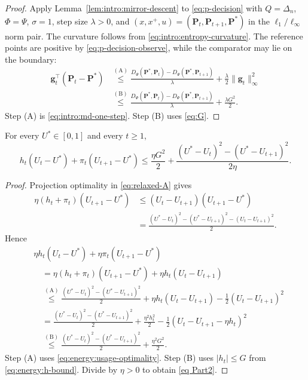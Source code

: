 \begin{proof}
Apply Lemma~\ref{lem:intro:mirror-descent} to \eqref{eq:p-decision}
with $Q=\Delta_n$, $\Phi=\Psi$, $\sigma=1$, step size $\lambda>0$,
and $(x,x^+,u)=(\mathbf P_t,\mathbf P_{t+1},\mathbf P^*)$ in the
$\ell_1/\ell_\infty$ norm pair. The curvature follows from
\eqref{eq:intro:entropy-curvature}. The reference points are positive by
\eqref{eq:p-decision-observe}, while the comparator may lie on the boundary:
\[
\begin{aligned}
 \mathbf g_t^\top(\mathbf P_t-\mathbf P^*)
 &\overset{\mathrm{(A)}}{\leq}
 \frac{D_\Psi(\mathbf P^*,\mathbf P_t)-D_\Psi(\mathbf P^*,\mathbf P_{t+1})}{\lambda}
 +\frac{\lambda}{2}\|\mathbf g_t\|_\infty^2\\
 &\overset{\mathrm{(B)}}{\leq}
 \frac{D_\Psi(\mathbf P^*,\mathbf P_t)-D_\Psi(\mathbf P^*,\mathbf P_{t+1})}{\lambda}
 +\frac{\lambda G^2}{2}.
\end{aligned}
\]
Step (A) is \eqref{eq:intro:md-one-step}. Step (B) uses \eqref{eq:G}.
\end{proof}

\begin{Thm:Lemma}
\label{lem:ch3-usage-bound}
For every $U^*\in[0,1]$ and every $t\geq1$,
\begin{equation}
\label{eq Part2}
 h_t(U_t-U^*)+\pi_t(U_{t+1}-U^*) \leq{}\frac{\eta G^2}{2}
   +\frac{(U^*-U_t)^2-(U^*-U_{t+1})^2}{2\eta}.
\end{equation}
\end{Thm:Lemma}

\begin{proof}
Projection optimality in \eqref{eq:relaxed-A} gives
\begin{equation}\label{eq:energy:usage-optimality}
\begin{aligned}
 \eta(h_t+\pi_t)(U_{t+1}-U^*)
 &\leq(U_t-U_{t+1})(U_{t+1}-U^*)\\
 &=\frac{(U^*-U_t)^2-(U^*-U_{t+1})^2-(U_t-U_{t+1})^2}{2}.
\end{aligned}
\end{equation}
Hence
\begin{equation}
\label{eq:main2}
\begin{aligned}
 &\eta h_t(U_t-U^*)+\eta\pi_t(U_{t+1}-U^*)\\
 &\quad=\eta(h_t+\pi_t)(U_{t+1}-U^*)+\eta h_t(U_t-U_{t+1})\\
 &\quad\overset{\mathrm{(A)}}{\leq}
   \frac{(U^*-U_t)^2-(U^*-U_{t+1})^2}{2}
   +\eta h_t(U_t-U_{t+1})-\frac12(U_t-U_{t+1})^2\\
 &\quad=\frac{(U^*-U_t)^2-(U^*-U_{t+1})^2}{2}
   +\frac{\eta^2h_t^2}{2}-\frac12(U_t-U_{t+1}-\eta h_t)^2\\
 &\quad\overset{\mathrm{(B)}}{\leq}
   \frac{(U^*-U_t)^2-(U^*-U_{t+1})^2}{2}+\frac{\eta^2G^2}{2}.
\end{aligned}
\end{equation}
Step (A) uses \eqref{eq:energy:usage-optimality}.
Step (B) uses $|h_t|\leq G$ from \eqref{eq:energy:h-bound}.
Divide by $\eta>0$ to obtain \eqref{eq Part2}.
\end{proof}

